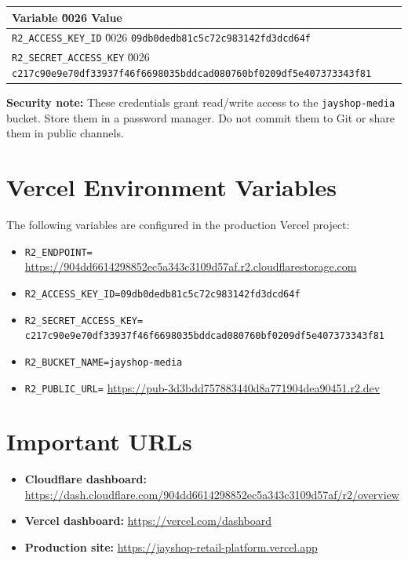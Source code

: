 \documentclass[10pt]{article}
\begin{document}
\begin{longtable}{p{3.8cm} p{10.5cm}}
\toprule
\textbf{Variable} \u0026 \textbf{Value} \\
\midrule
\endhead
\texttt{R2\_ACCESS\_KEY\_ID} \u0026 \texttt{09db0dedb81c5c72c983142fd3dcd64f} \\
\texttt{R2\_SECRET\_ACCESS\_KEY} \u0026 \texttt{c217c90e9e70df33937f46f6698035bddcad080760bf0209df5e407373343f81} \\
\bottomrule
\end{longtable}

\noindent\textbf{Security note:} These credentials grant read/write access to the \texttt{jayshop-media} bucket. Store them in a password manager. Do not commit them to Git or share them in public channels.

\section*{Vercel Environment Variables}

The following variables are configured in the production Vercel project:

\begin{itemize}[leftmargin=*]
  \item \texttt{R2\_ENDPOINT=}
  \newline \url{https://904dd6614298852ec5a343c3109d57af.r2.cloudflarestorage.com}
  \item \texttt{R2\_ACCESS\_KEY\_ID=09db0dedb81c5c72c983142fd3dcd64f}
  \item \texttt{R2\_SECRET\_ACCESS\_KEY=}
  \newline \texttt{c217c90e9e70df33937f46f6698035bddcad080760bf0209df5e407373343f81}
  \item \texttt{R2\_BUCKET\_NAME=jayshop-media}
  \item \texttt{R2\_PUBLIC\_URL=}
  \newline \url{https://pub-3d3bdd757883440d8a771904dea90451.r2.dev}
\end{itemize}

\section*{Important URLs}

\begin{itemize}[leftmargin=*]
  \item \textbf{Cloudflare dashboard:} \url{https://dash.cloudflare.com/904dd6614298852ec5a343c3109d57af/r2/overview}
  \item \textbf{Vercel dashboard:} \url{https://vercel.com/dashboard}
  \item \textbf{Production site:} \url{https://jayshop-retail-platform.vercel.app}
\end{itemize}
\end{document}
